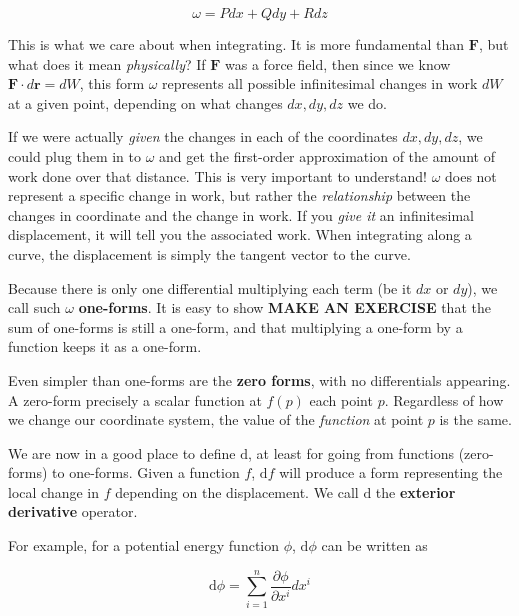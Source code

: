 \documentclass[../master.tex]{subfiles}
\begin{document}
	\begin{equation*}
		\omega = P dx + Q dy + R dz
	\end{equation*}
	
	This is what we care about when integrating. It is more fundamental than $\mathbf{F}$, but what does it mean \emph{physically}? If $\mathbf{F}$ was a force field, then since we know $\mathbf{F} \cdot d \mathbf{r} = dW$, this form $\omega$ represents all possible infinitesimal changes in work $dW$ at a given point, depending on what changes $dx,dy,dz$ we do.
	
	If we were actually \emph{given} the changes in each of the coordinates $dx,dy,dz$, we could plug them in to $\omega$ and get the first-order approximation of the amount of work done over that distance. This is very important to understand! $\omega$ does not represent a specific change in work, but rather the \emph{relationship} between the changes in coordinate and the change in work. If you \emph{give it} an infinitesimal displacement, it will tell you the associated work. When integrating along a curve, the displacement is simply the tangent vector to the curve.
		
	Because there is only one differential multiplying each term (be it $dx$ or $dy$), we call such $\omega$ \textbf{one-forms}.  It is easy to show \textbf{MAKE AN EXERCISE} that the sum of one-forms is still a one-form, and that multiplying a one-form by a function keeps it as a one-form. 
	
	Even simpler than one-forms are the \textbf{zero forms}, with no differentials appearing. A zero-form precisely a scalar function at $f(p)$ each point $p$. Regardless of how we change our coordinate system, the value of the \emph{function} at point $p$ is the same.
	
	We are now in a good place to define $\mathrm d$, at least for going from functions (zero-forms) to one-forms. Given a function $f$, $\mathrm d f$ will produce a form representing the local change in $f$ depending on the displacement. We call $\mathrm d$ the \textbf{exterior derivative}  operator.
	
	For example, for a potential energy function $\phi$, $\mathrm d \phi$ can be written as 
	
	\begin{equation}
		\mathrm d \phi = \sum_{i=1}^n \frac{\partial \phi}{\partial x^i} dx^i
	\end{equation}
	
\end{document}
